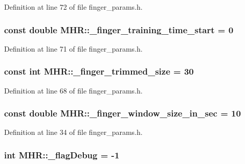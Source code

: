 Definition at line 72 of file finger\+\_\+params.\+h.

\hypertarget{namespace_m_h_r_afcd48923eb1d7b2aff98acc4cf2a9d24}{
\subsubsection[{\+\_\+finger\+\_\+training\+\_\+time\+\_\+start}]{\setlength{\rightskip}{0pt plus 5cm}const double M\+H\+R\+::\+\_\+finger\+\_\+training\+\_\+time\+\_\+start = 0}}\label{namespace_m_h_r_afcd48923eb1d7b2aff98acc4cf2a9d24}


Definition at line 71 of file finger\+\_\+params.\+h.

\hypertarget{namespace_m_h_r_a8a6e23a5b4183588a231061fe7d43524}{
\subsubsection[{\+\_\+finger\+\_\+trimmed\+\_\+size}]{\setlength{\rightskip}{0pt plus 5cm}const int M\+H\+R\+::\+\_\+finger\+\_\+trimmed\+\_\+size = 30}}\label{namespace_m_h_r_a8a6e23a5b4183588a231061fe7d43524}


Definition at line 68 of file finger\+\_\+params.\+h.

\hypertarget{namespace_m_h_r_a04093f94b342ed569322ef2c3a5bcce2}{
\subsubsection[{\+\_\+finger\+\_\+window\+\_\+size\+\_\+in\+\_\+sec}]{\setlength{\rightskip}{0pt plus 5cm}const double M\+H\+R\+::\+\_\+finger\+\_\+window\+\_\+size\+\_\+in\+\_\+sec = 10}}\label{namespace_m_h_r_a04093f94b342ed569322ef2c3a5bcce2}


Definition at line 34 of file finger\+\_\+params.\+h.

\hypertarget{namespace_m_h_r_ae2f1f5bafa06074dcb8f0af01a058c81}{
\subsubsection[{\+\_\+flag\+Debug}]{\setlength{\rightskip}{0pt plus 5cm}int M\+H\+R\+::\+\_\+flag\+Debug = -\/1}}\label{namespace_m_h_r_ae2f1f5bafa06074dcb8f0af01a058c81}


